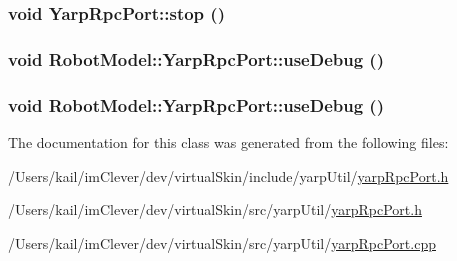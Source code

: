 \label{class_robot_model_1_1_yarp_rpc_port_a7c02179416d26e3e741a385cc1320278}
\hypertarget{class_robot_model_1_1_yarp_rpc_port_a1554e6c2e38cb71f2521280f65bbab05}{
\subsubsection[{stop}]{\setlength{\rightskip}{0pt plus 5cm}void YarpRpcPort::stop ()}}
\label{class_robot_model_1_1_yarp_rpc_port_a1554e6c2e38cb71f2521280f65bbab05}
\hypertarget{class_robot_model_1_1_yarp_rpc_port_a6fe22d6e8403cb3560964dd31d66c243}{
\subsubsection[{useDebug}]{\setlength{\rightskip}{0pt plus 5cm}void RobotModel::YarpRpcPort::useDebug ()}}
\label{class_robot_model_1_1_yarp_rpc_port_a6fe22d6e8403cb3560964dd31d66c243}
\hypertarget{class_robot_model_1_1_yarp_rpc_port_a6fe22d6e8403cb3560964dd31d66c243}{
\subsubsection[{useDebug}]{\setlength{\rightskip}{0pt plus 5cm}void RobotModel::YarpRpcPort::useDebug ()}}
\label{class_robot_model_1_1_yarp_rpc_port_a6fe22d6e8403cb3560964dd31d66c243}


The documentation for this class was generated from the following files:\begin{DoxyCompactItemize}
\item 
/Users/kail/imClever/dev/virtualSkin/include/yarpUtil/\hyperlink{include_2yarp_util_2yarp_rpc_port_8h}{yarpRpcPort.h}\item 
/Users/kail/imClever/dev/virtualSkin/src/yarpUtil/\hyperlink{src_2yarp_util_2yarp_rpc_port_8h}{yarpRpcPort.h}\item 
/Users/kail/imClever/dev/virtualSkin/src/yarpUtil/\hyperlink{yarp_rpc_port_8cpp}{yarpRpcPort.cpp}\end{DoxyCompactItemize}
